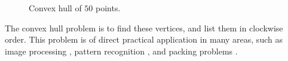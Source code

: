 \begin{figure}[ht]
{
    }
    \caption{Convex hull of $50$ points.}
    \label{fig:convex_hull}
\end{figure}

The convex hull problem is to find these vertices, and list them
in clockwise order. This problem is of direct practical application in many
areas, such as image processing \cite{Rosenfeld69}, pattern recognition
\cite{Duda74}, and packing problems \cite{Freeman75}.
\fi
